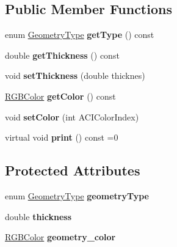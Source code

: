 \subsection*{Public Member Functions}
\begin{DoxyCompactItemize}
\item 
enum \hyperlink{class_c_a_d_geometry_a0515ed61d3514d528f78b8ba6c4fc5f3}{Geometry\+Type} {\bfseries get\+Type} () const \hypertarget{class_c_a_d_geometry_a17ef31adb00b91060cf27595c8df6330}{}\label{class_c_a_d_geometry_a17ef31adb00b91060cf27595c8df6330}

\item 
double {\bfseries get\+Thickness} () const \hypertarget{class_c_a_d_geometry_afb804aa9994b188d8ea4728076c29964}{}\label{class_c_a_d_geometry_afb804aa9994b188d8ea4728076c29964}

\item 
void {\bfseries set\+Thickness} (double thicknes)\hypertarget{class_c_a_d_geometry_abd3022d752e37dac79b92519a15a7fe2}{}\label{class_c_a_d_geometry_abd3022d752e37dac79b92519a15a7fe2}

\item 
\hyperlink{struct_r_g_b_color}{R\+G\+B\+Color} {\bfseries get\+Color} () const \hypertarget{class_c_a_d_geometry_a1f77b5cdf9479129ccbc69d19be5d65e}{}\label{class_c_a_d_geometry_a1f77b5cdf9479129ccbc69d19be5d65e}

\item 
void {\bfseries set\+Color} (int A\+C\+I\+Color\+Index)\hypertarget{class_c_a_d_geometry_a894393c4f6fece4b7e9256aaa5448770}{}\label{class_c_a_d_geometry_a894393c4f6fece4b7e9256aaa5448770}

\item 
virtual void {\bfseries print} () const  =0\hypertarget{class_c_a_d_geometry_aece81ef419d3ad207171bcca57a097dd}{}\label{class_c_a_d_geometry_aece81ef419d3ad207171bcca57a097dd}

\end{DoxyCompactItemize}
\subsection*{Protected Attributes}
\begin{DoxyCompactItemize}
\item 
enum \hyperlink{class_c_a_d_geometry_a0515ed61d3514d528f78b8ba6c4fc5f3}{Geometry\+Type} {\bfseries geometry\+Type}\hypertarget{class_c_a_d_geometry_a34a284842b50d41052f7abc396ed7f91}{}\label{class_c_a_d_geometry_a34a284842b50d41052f7abc396ed7f91}

\item 
double {\bfseries thickness}\hypertarget{class_c_a_d_geometry_acbd206b728d8f720c3d0ac76ccdd0d33}{}\label{class_c_a_d_geometry_acbd206b728d8f720c3d0ac76ccdd0d33}

\item 
\hyperlink{struct_r_g_b_color}{R\+G\+B\+Color} {\bfseries geometry\+\_\+color}\hypertarget{class_c_a_d_geometry_a0d8a3754c859cc103c7ca839d14f279c}{}\label{class_c_a_d_geometry_a0d8a3754c859cc103c7ca839d14f279c}

\end{DoxyCompactItemize}


